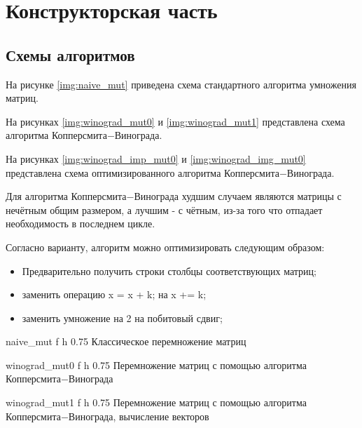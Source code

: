 \chapter{Конструкторская часть}

\section{Схемы алгоритмов}

На рисунке \ref{img:naive_mut} приведена схема стандартного алгоритма умножения матриц.

На рисунках \ref{img:winograd_mut0} и \ref{img:winograd_mut1} представлена схема алгоритма Копперсмита$-$Винограда.

На рисунках \ref{img:winograd_imp_mut0} и \ref{img:winograd_img_mut0} представлена схема оптимизированного алгоритма Копперсмита$-$Винограда.

Для алгоритма Копперсмита$-$Винограда худшим случаем являются матрицы с нечётным общим размером, а лучшим - с чётным,
из-за того что отпадает необходимость в последнем цикле.

Согласно варианту, алгоритм можно оптимизировать следующим образом:
\begin{itemize}
    \item Предварительно получить строки столбцы соответствующих матриц;
    \item заменить операцию x = x + k; на x += k;
    \item заменить умножение на 2 на побитовый сдвиг;
\end{itemize}

{naive_mut} %
{f} %
{h} %
{0.75\textwidth} %
{Классическое перемножение матриц} %
\clearpage

{winograd_mut0} %
{f} %
{h} %
{0.75\textwidth} %
{Перемножение матриц с помощью алгоритма Копперсмита$-$Винограда} %
\clearpage

{winograd_mut1} %
{f} %
{h} %
{0.75\textwidth} %
{Перемножение матриц с помощью алгоритма Копперсмита$-$Винограда, вычисление векторов} %
\clearpage

